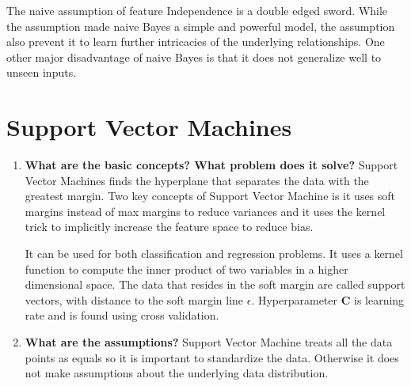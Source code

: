 \documentclass{article}
\begin{document}
\begin{enumerate}
    The naive assumption of feature Independence is a double edged sword. While the assumption made naive Bayes a simple and powerful model, the assumption also prevent it to learn further intricacies of the underlying relationships. One other major disadvantage of naive Bayes is that it does not generalize well to unseen inputs.
    
\end{enumerate}
\pagebreak

\section{Support Vector Machines}
\noindent
\begin{enumerate}
    \item \textbf{What are the basic concepts? What problem does it solve?}
    \noindent 
    \smallbreak
    Support Vector Machines finds the hyperplane that separates the data with the greatest margin. Two key concepts of Support Vector Machine is it uses soft margins instead of max margins to reduce variances and it uses the kernel trick to implicitly increase the feature space to reduce bias. 
    
    It can be used for both classification and regression problems. It uses a kernel function to compute the inner product of two variables in a higher dimensional space. The data that resides in the soft margin are called support vectors, with distance to the soft margin line $\epsilon$. Hyperparameter \textbf{C} is learning rate and is found using cross validation.
    
    \item \textbf{What are the assumptions?}
    \noindent 
    \smallbreak
    Support Vector Machine treats all the data points as equals so it is important to standardize the data. Otherwise it does not make assumptions about the underlying data distribution.
    

\end{enumerate}
\end{document}
